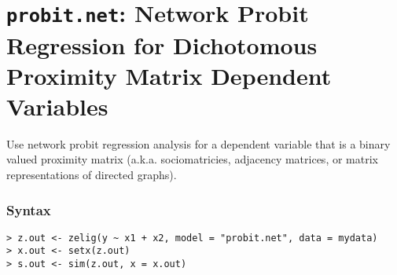 \section{{\tt probit.net}: Network Probit Regression for Dichotomous Proximity Matrix Dependent Variables}

Use network probit regression analysis for a dependent variable that is a binary valued proximity matrix (a.k.a. sociomatricies, adjacency matrices, or matrix representations of directed graphs). 

\subsubsection{Syntax}
\begin{verbatim}
> z.out <- zelig(y ~ x1 + x2, model = "probit.net", data = mydata) 
> x.out <- setx(z.out)
> s.out <- sim(z.out, x = x.out)
\end{verbatim}



